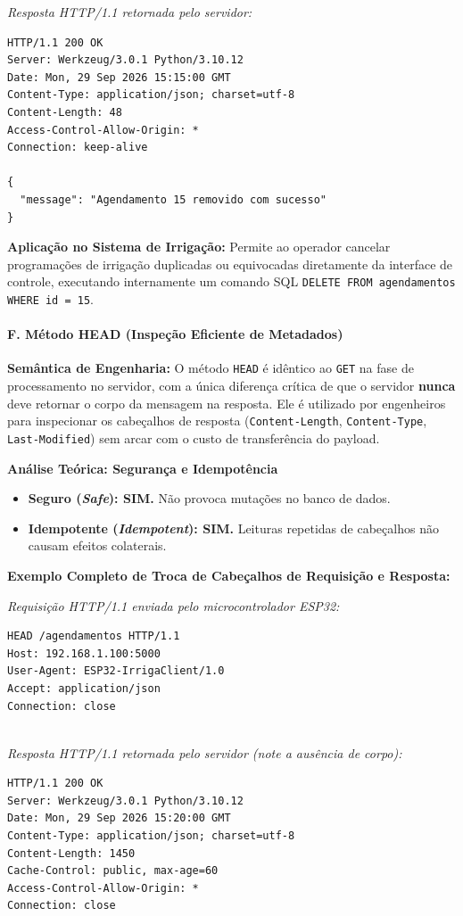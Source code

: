 \textit{Resposta HTTP/1.1 retornada pelo servidor:}
\begin{lstlisting}
HTTP/1.1 200 OK
Server: Werkzeug/3.0.1 Python/3.10.12
Date: Mon, 29 Sep 2026 15:15:00 GMT
Content-Type: application/json; charset=utf-8
Content-Length: 48
Access-Control-Allow-Origin: *
Connection: keep-alive

{
  "message": "Agendamento 15 removido com sucesso"
}
\end{lstlisting}

\textbf{Aplicação no Sistema de Irrigação:} Permite ao operador cancelar programações de irrigação duplicadas ou equivocadas diretamente da interface de controle, executando internamente um comando SQL \texttt{DELETE FROM agendamentos WHERE id = 15}.

\paragraph*{F. Método HEAD (Inspeção Eficiente de Metadados)}

\textbf{Semântica de Engenharia:} O método \texttt{HEAD} é idêntico ao \texttt{GET} na fase de processamento no servidor, com a única diferença crítica de que o servidor \textbf{nunca} deve retornar o corpo da mensagem na resposta. Ele é utilizado por engenheiros para inspecionar os cabeçalhos de resposta (\texttt{Content-Length}, \texttt{Content-Type}, \texttt{Last-Modified}) sem arcar com o custo de transferência do payload.

\textbf{Análise Teórica: Segurança e Idempotência}
\begin{itemize}
    \item \textbf{Seguro (\textit{Safe}): SIM.} Não provoca mutações no banco de dados.
    \item \textbf{Idempotente (\textit{Idempotent}): SIM.} Leituras repetidas de cabeçalhos não causam efeitos colaterais.
\end{itemize}

\textbf{Exemplo Completo de Troca de Cabeçalhos de Requisição e Resposta:}

\textit{Requisição HTTP/1.1 enviada pelo microcontrolador ESP32:}
\begin{lstlisting}
HEAD /agendamentos HTTP/1.1
Host: 192.168.1.100:5000
User-Agent: ESP32-IrrigaClient/1.0
Accept: application/json
Connection: close


\end{lstlisting}

\textit{Resposta HTTP/1.1 retornada pelo servidor (note a ausência de corpo):}
\begin{lstlisting}
HTTP/1.1 200 OK
Server: Werkzeug/3.0.1 Python/3.10.12
Date: Mon, 29 Sep 2026 15:20:00 GMT
Content-Type: application/json; charset=utf-8
Content-Length: 1450
Cache-Control: public, max-age=60
Access-Control-Allow-Origin: *
Connection: close


\end{lstlisting}

